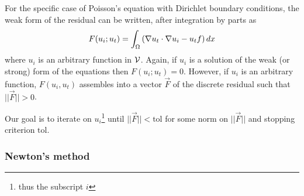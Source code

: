 For the specific case of Poisson's equation with Dirichlet boundary conditions,
the weak form of the residual can be written, after integration by
parts as
\begin{equation}
  \label{eq:4}
  F(u_{i};u_{t}) = \int_{\Omega}
  \left(
    \nabla u_{t}\cdot\nabla u_{i} - u_{t}f
  \right)dx
\end{equation}
where $u_{i}$ is an arbitrary function in $\mathcal{V}$.   Again, if
$u_{i}$ is a solution of the weak (or strong) form of the equations
then $F(u_{i};u_{t})=0$.  However, if  $u_{i}$ is an arbitrary
function, $F(u_{i},u_{t})$ assembles into a vector $\vec{F}$ of the
discrete residual such that $||\vec{F}||>0$.  

Our goal is to iterate on $u_{i}$\footnote{thus the subscript
$i$} until $||\vec{F}||<\mathrm{tol}$ for some norm on $||\vec{F}||$ and stopping
criterion $\mathrm{tol}$.

\subsubsection{Newton's method}
\label{sec:newtons-method}

